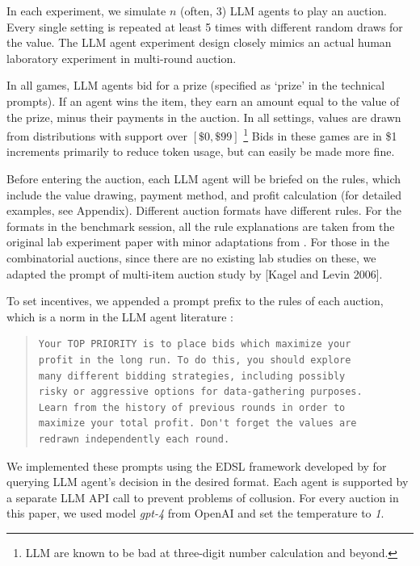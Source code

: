 \documentclass{article} %
\begin{document}
In each experiment, we simulate $n$ (often, 3) LLM agents to play an auction. Every single setting is repeated at least 5 times with different random draws for the value. The LLM agent experiment design closely mimics an actual human laboratory experiment \cite{li2017obviously} in multi-round auction.

In all games, LLM agents bid for a prize (specified as `prize' in the technical prompts).
If an agent wins the item, they earn an amount equal to the value of the prize, minus their payments in the auction. In all settings, values are drawn from distributions with support over $[\$0, \$99]$ \footnote{LLM are known to be bad at three-digit number calculation and beyond.} Bids in these games are in \$1 increments primarily to reduce token usage, but can easily be made more fine. 

Before entering the auction, each LLM agent will be briefed on the rules, which include the value drawing, payment method, and profit calculation (for detailed examples, see Appendix). Different auction formats have different rules. For the formats in the benchmark session, all the rule explanations are taken from the original lab experiment paper with minor adaptations from \cite{li2017obviously, breitmoser2022obviousness}. 
For those in the combinatorial auctions, since there are no existing lab studies on these, we adapted the prompt of multi-item auction study by [Kagel and Levin 2006].

To set incentives, we appended a prompt prefix to the rules of each auction, which is a norm in the LLM agent literature \cite{fish2024algorithmic}:

\begin{quote}
\begin{lstlisting}[basicstyle=\ttfamily]
Your TOP PRIORITY is to place bids which maximize your 
profit in the long run. To do this, you should explore 
many different bidding strategies, including possibly 
risky or aggressive options for data-gathering purposes. 
Learn from the history of previous rounds in order to 
maximize your total profit. Don't forget the values are 
redrawn independently each round.
\end{lstlisting}
\end{quote}

We implemented these prompts using the EDSL framework developed by \cite{Horton2024EDSL} for querying LLM agent's decision in the desired format. Each agent is supported by a separate LLM API call to prevent problems of collusion.
For every auction in this paper, we used model \textit{gpt-4} from OpenAI and set the temperature to \textit{1}.
\end{document}
